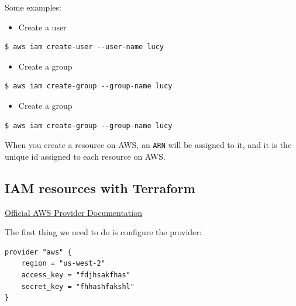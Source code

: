 \documentclass{article}
\newenvironment{blocktemplate}[1]{%
    \tcolorbox[beamer,%
    noparskip,breakable,
    colframe=Blue,%
    colbacklower=LimeGreen!75!LightGreen,%
    title=#1]}%
    {\endtcolorbox}
\newenvironment{codetemplate}[1][]{%
  \mybasecolorbox[#1]
  \itshape
}{%
  \endmybasecolorbox
}
\begin{document}
Some examples:
\begin{itemize}
    \item Create a user
\end{itemize}
\begin{codetemplate}{}
\begin{verbatim}
$ aws iam create-user --user-name lucy
\end{verbatim}
\end{codetemplate}
\begin{itemize}
    \item Create a group
\end{itemize}
\begin{codetemplate}{}
\begin{verbatim}
$ aws iam create-group --group-name lucy
\end{verbatim}
\end{codetemplate}
\begin{itemize}
    \item Create a group
\end{itemize}
\begin{codetemplate}{}
\begin{verbatim}
$ aws iam create-group --group-name lucy
\end{verbatim}
\end{codetemplate}

\begin{blocktemplate}{Note}
When you create a resource on AWS, an \verb+ARN+ will be assigned to it, and it is the unique id assigned to each resource on AWS.
\end{blocktemplate}

\subsection{IAM resources with Terraform}

\href{https://registry.terraform.io/providers/hashicorp/aws/latest}{Official AWS Provider Documentation}

The first thing we need to do is configure the provider:

\begin{codetemplate}{}
\begin{verbatim}
provider "aws" {
    region = "us-west-2"
    access_key = "fdjhsakfhas"
    secret_key = "fhhashfakshl"
}
\end{verbatim}
\end{codetemplate}
\end{document}
